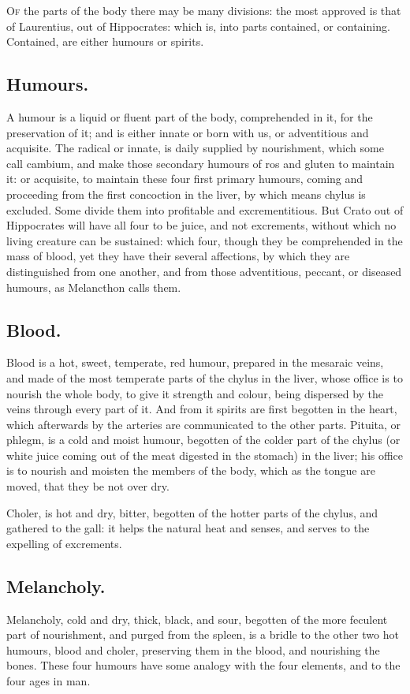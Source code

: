 {\lettrine{O}{f} the parts of the body there may be many divisions: the most approved
is that of Laurentius, out of Hippocrates: which is, into parts
contained, or containing. Contained, are either humours or spirits.
\subsection{Humours.}
A humour is a liquid or fluent part of the body,
comprehended in it, for the preservation of it; and is either innate or
born with us, or adventitious and acquisite. The radical or innate, is
daily supplied by nourishment, which some call cambium, and make those
secondary humours of ros and gluten to maintain it: or acquisite, to
maintain these four first primary humours, coming and proceeding from
the first concoction in the liver, by which means chylus is excluded.
Some divide them into profitable and excrementitious. But Crato
out of Hippocrates will have all four to be juice, and not excrements,
without which no living creature can be sustained: which four, though
they be comprehended in the mass of blood, yet they have their several
affections, by which they are distinguished from one another, and from
those adventitious, peccant, or diseased humours, as Melancthon
calls them.
\subsection{Blood.}
Blood is a hot, sweet, temperate, red humour, prepared in the
mesaraic veins, and made of the most temperate parts of the chylus in
the liver, whose office is to nourish the whole body, to give it
strength and colour, being dispersed by the veins through every part of
it. And from it spirits are first begotten in the heart, which
afterwards by the arteries are communicated to the other parts.
Pituita, or phlegm, is a cold and moist humour, begotten of the colder
part of the chylus (or white juice coming out of the meat digested in
the stomach) in the liver; his office is to nourish and moisten the
members of the body, which as the tongue are moved, that they be not
over dry.

Choler, is hot and dry, bitter, begotten of the hotter parts of the
chylus, and gathered to the gall: it helps the natural heat and senses,
and serves to the expelling of excrements.

\subsection{Melancholy.}
Melancholy, cold and dry, thick, black, and sour,
begotten of the more feculent part of nourishment, and purged from the
spleen, is a bridle to the other two hot humours, blood and choler,
preserving them in the blood, and nourishing the bones. These four
humours have some analogy with the four elements, and to the four ages
in man.

}
